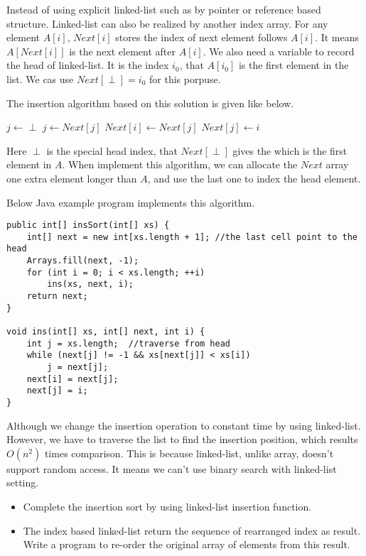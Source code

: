 \documentclass{article}
\begin{document}
Instead of using explicit linked-list such as by pointer or reference
based structure. Linked-list can also be realized by another index array.
For any element $A[i]$, $Next[i]$ stores the index of next element
follows $A[i]$. It means $A[Next[i]]$ is the next element after $A[i]$.
We also need a variable to record the head of linked-list. It is the
index $i_0$, that $A[i_0]$ is the first element in the list. We cas use
$Next[\perp] = i_0$ for this porpuse.

The insertion algorithm based on this solution is given like below.

\begin{algorithmic}
  \State $j \gets \perp$
    \State $j \gets Next[j]$
  \EndWhile
  \State $Next[i] \gets Next[j]$
  \State $Next[j] \gets i$
\EndFunction
\end{algorithmic}

Here $\perp$ is the special head index, that $Next[\perp]$ gives the
which is the first element in $A$. When implement this algorithm, we
can allocate the $Next$ array one extra element longer than $A$, and
use the last one to index the head element.

Below Java example program implements this algorithm.

\lstset{language=Java}
\begin{lstlisting}
public int[] insSort(int[] xs) {
    int[] next = new int[xs.length + 1]; //the last cell point to the head
    Arrays.fill(next, -1);
    for (int i = 0; i < xs.length; ++i)
        ins(xs, next, i);
    return next;
}

void ins(int[] xs, int[] next, int i) {
    int j = xs.length;  //traverse from head
    while (next[j] != -1 && xs[next[j]] < xs[i])
        j = next[j];
    next[i] = next[j];
    next[j] = i;
}
\end{lstlisting}

Although we change the insertion operation to constant time by using
linked-list. However, we have to traverse the list to find the insertion
position, which results $O(n^2)$ times comparison. This is because
linked-list, unlike array, doesn't support random access. It means we
can't use binary search with linked-list setting.

\begin{Exercise}
\begin{itemize}
\item Complete the insertion sort by using linked-list insertion function.
\item The index based linked-list return the sequence of rearranged index
as result. Write a program to re-order the original array of elements from
this result.
\end{itemize}
\end{Exercise}
\end{document}
